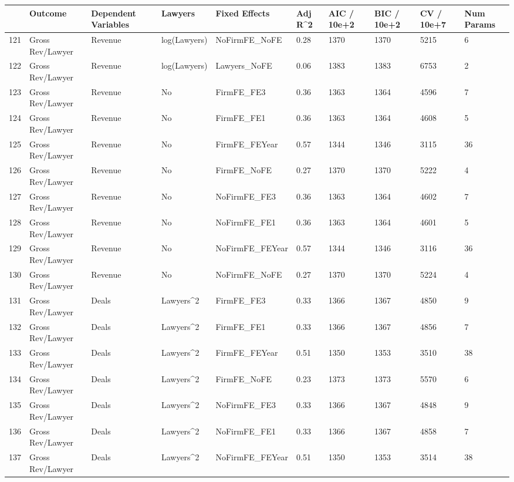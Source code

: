 \documentclass{article}
\begin{document}
\begin{table}[H]
\centering
\begin{tabular}{rlllllllll}
  \hline
 & Outcome & Dependent Variables & Lawyers & Fixed Effects & Adj R^2 & AIC / 10e+2 & BIC / 10e+2 & CV / 10e+7 & Num Params \\ 
  \hline
121 & Gross Rev/Lawyer & Revenue & log(Lawyers) & NoFirmFE\_NoFE & 0.28 & 1370 & 1370 & 5215 & 6 \\ 
  122 & Gross Rev/Lawyer & Revenue & log(Lawyers) & Lawyers\_NoFE & 0.06 & 1383 & 1383 & 6753 & 2 \\ 
  123 & Gross Rev/Lawyer & Revenue & No & FirmFE\_FE3 & 0.36 & 1363 & 1364 & 4596 & 7 \\ 
  124 & Gross Rev/Lawyer & Revenue & No & FirmFE\_FE1 & 0.36 & 1363 & 1364 & 4608 & 5 \\ 
  125 & Gross Rev/Lawyer & Revenue & No & FirmFE\_FEYear & 0.57 & 1344 & 1346 & 3115 & 36 \\ 
  126 & Gross Rev/Lawyer & Revenue & No & FirmFE\_NoFE & 0.27 & 1370 & 1370 & 5222 & 4 \\ 
  127 & Gross Rev/Lawyer & Revenue & No & NoFirmFE\_FE3 & 0.36 & 1363 & 1364 & 4602 & 7 \\ 
  128 & Gross Rev/Lawyer & Revenue & No & NoFirmFE\_FE1 & 0.36 & 1363 & 1364 & 4601 & 5 \\ 
  129 & Gross Rev/Lawyer & Revenue & No & NoFirmFE\_FEYear & 0.57 & 1344 & 1346 & 3116 & 36 \\ 
  130 & Gross Rev/Lawyer & Revenue & No & NoFirmFE\_NoFE & 0.27 & 1370 & 1370 & 5224 & 4 \\ 
  131 & Gross Rev/Lawyer & Deals & Lawyers^2 & FirmFE\_FE3 & 0.33 & 1366 & 1367 & 4850 & 9 \\ 
  132 & Gross Rev/Lawyer & Deals & Lawyers^2 & FirmFE\_FE1 & 0.33 & 1366 & 1367 & 4856 & 7 \\ 
  133 & Gross Rev/Lawyer & Deals & Lawyers^2 & FirmFE\_FEYear & 0.51 & 1350 & 1353 & 3510 & 38 \\ 
  134 & Gross Rev/Lawyer & Deals & Lawyers^2 & FirmFE\_NoFE & 0.23 & 1373 & 1373 & 5570 & 6 \\ 
  135 & Gross Rev/Lawyer & Deals & Lawyers^2 & NoFirmFE\_FE3 & 0.33 & 1366 & 1367 & 4848 & 9 \\ 
  136 & Gross Rev/Lawyer & Deals & Lawyers^2 & NoFirmFE\_FE1 & 0.33 & 1366 & 1367 & 4858 & 7 \\ 
  137 & Gross Rev/Lawyer & Deals & Lawyers^2 & NoFirmFE\_FEYear & 0.51 & 1350 & 1353 & 3514 & 38 \\ 

\end{tabular}
\end{table}
\end{document}
